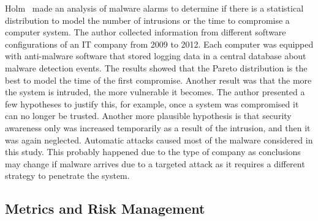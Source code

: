 Holm~\cite{Holm:2014} made an analysis of malware alarms to determine if there is a statistical distribution to model the number of intrusions or the time to compromise a computer system.
The author collected information from different software configurations of an  IT company from 2009 to 2012.
Each computer was equipped with anti-malware software that stored logging data in a central database about malware detection events.
The results showed that the Pareto distribution is the best to model the time of the first compromise.
Another result was that the more the system is intruded, the more vulnerable it becomes. 
The author presented a few hypotheses to justify this, for example, once a system was compromised it can no longer be trusted. 
Another more plausible hypothesis is that security awareness only was increased temporarily as a result of the intrusion, and then it was again neglected.
Automatic attacks caused most of the malware considered in this study.
This probably happened due to the type of company as conclusions may change if malware arrives due to a targeted attack as it requires a different strategy to penetrate the system.


\subsection{Metrics and Risk Management}




